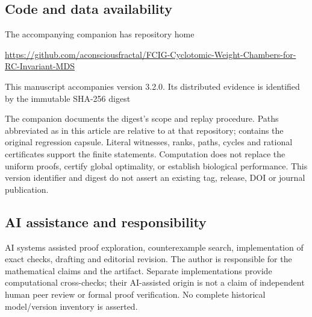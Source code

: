 \subsection{Code and data availability}
The accompanying companion has repository home
\begin{center}\small
\url{https://github.com/aconsciousfractal/FCIG-Cyclotomic-Weight-Chambers-for-RC-Invariant-MDS}
\end{center}
This manuscript accompanies version 3.2.0. Its distributed evidence is identified by the immutable SHA-256 digest
\begin{center}\small\texttt{\EvidenceDigest}\end{center}
The companion documents the digest's scope and replay procedure. Paths abbreviated as  in this article are relative to  at that repository;  contains the original regression capsule. Literal witnesses, ranks, paths, cycles and rational certificates support the finite statements. Computation does not replace the uniform proofs, certify global optimality, or establish biological performance. This version identifier and digest do not assert an existing tag, release, DOI or journal publication.

\subsection*{AI assistance and responsibility}
AI systems assisted proof exploration, counterexample search, implementation of exact checks, drafting and editorial revision. The author is responsible for the mathematical claims and the artifact. Separate implementations provide computational cross-checks; their AI-assisted origin is not a claim of independent human peer review or formal proof verification. No complete historical model/version inventory is asserted.
